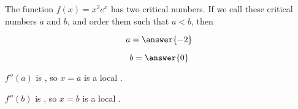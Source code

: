 \documentclass{ximera}
\author{Steven Gubkin}
\begin{document}
\begin{exercise}

The function $f(x) = x^2e^x$ has two critical numbers.  If we call
these critical numbers $a$ and $b$, and order them such that $a < b$,
then

$$
a = \answer{-2}
$$

$$
b=\answer{0}
$$

$f''(a)$ is , so $x=a$ is a local .

$f''(b)$ is , so $x=b$ is a local .




\end{exercise}
\end{document}
